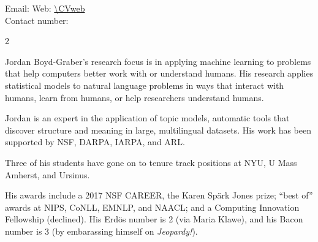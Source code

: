 \documentclass[10pt,a4paper]{article} %
\begin{document}

\maintitle{\CVname}{}  %

\noindent Email: \href{mailto:\CVemail}{\CVemail}\hfill
Web: \href{\CVweb}{\url{\CVweb}}\\
Contact number: \CVphone\\\CVaddress

\spacedhrule{0.9em}{-0.4em} %



\vspace{-1.3em} %

\begin{multicols}{2}  %

Jordan Boyd-Graber's research focus is in applying machine learning
to problems that help computers better
work with or understand humans.  His research
applies statistical models to natural language problems in ways that
interact with humans, learn from humans, or help researchers
understand humans.

Jordan is an expert in the application of topic models, automatic
tools that discover structure and meaning in large, multilingual
datasets. His work has been supported by NSF, DARPA, IARPA, and ARL.

Three of his students have gone on to tenure track positions at NYU, U
Mass Amherst, and Ursinus.

His awards include a 2017 NSF CAREER, the Karen Sp\"ark Jones prize;
``best of'' awards at NIPS, CoNLL, EMNLP, and NAACL; and a Computing
Innovation Fellowship (declined).  His Erd\"os number is 2 (via Maria Klawe), and his
Bacon number is 3 (by embarassing himself on \textit{Jeopardy!}).

\end{multicols}

\spacedhrule{0.5em}{-0.4em} %
\end{document}
